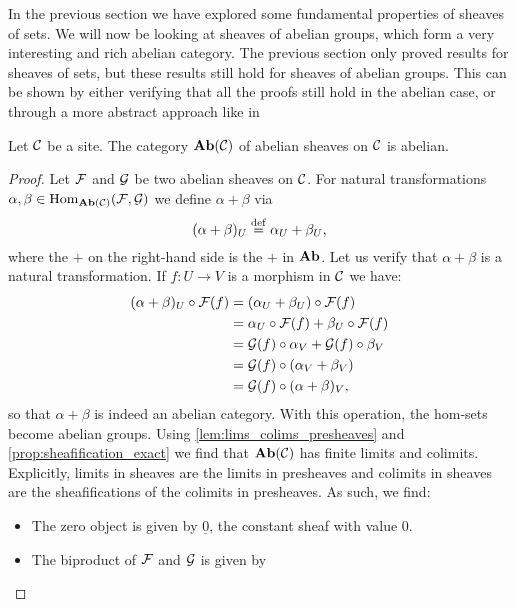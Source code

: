 \documentclass{article}
\begin{document}
In the previous section we have explored some
fundamental properties of sheaves of sets.
We will now be looking at sheaves of abelian groups,
which form a very interesting and rich abelian category.
The previous section only proved results for sheaves of
sets, but these results still hold for sheaves of abelian
groups. This can be shown by either verifying that all
the proofs still hold in the abelian case, or through
a more abstract approach like in
\cite[\href{https://stacks.math.columbia.edu/tag/00YR}{Section 00YR}]{stacks-project}
\begin{prop}
    Let $\mathcal{C}$ be a site. The category
    $\operatorname{\mathbf{Ab}}(\mathcal{C})$ of abelian sheaves on $\mathcal{C}$ is abelian.
\end{prop}
\begin{proof}
    Let $\mathcal{F}$ and $\mathcal{G}$ be two abelian sheaves on $\mathcal{C}$.
    For natural transformations $\alpha, \beta \in \operatorname{Hom}_{\operatorname{\mathbf{Ab}}(\mathcal{C})}(\mathcal{F}, \mathcal{G})$
    we define $\alpha + \beta$ via
    \begin{equation*}
        (\alpha + \beta)_U \overset{\mathrm{def}}{=} \alpha_U + \beta_U,
    \end{equation*}
    where the $+$ on the right-hand side is the $+$ in $\operatorname{\mathbf{Ab}}$.
    Let us verify that $\alpha + \beta$ is a natural transformation.
    If $f\colon U \to V$ is a morphism in $\mathcal{C}$ we have:
    \begin{align*}
        (\alpha + \beta)_U \circ \mathcal{F}(f)
         & = (\alpha_U + \beta_U) \circ \mathcal{F}(f)             \\
         & = \alpha_U \circ \mathcal{F}(f) + \beta_U \circ \mathcal{F}(f) \\
         & = \mathcal{G}(f) \circ \alpha_V + \mathcal{G}(f) \circ \beta_V \\
         & = \mathcal{G}(f) \circ (\alpha_V + \beta_V)             \\
         & = \mathcal{G}(f) \circ (\alpha + \beta)_V,
    \end{align*}
    so that $\alpha + \beta$ is indeed an abelian category.
    With this operation, the hom-sets become abelian groups.
    Using \cref{lem:lims_colims_presheaves} and \cref{prop:sheafification_exact}
    we find that $\operatorname{\mathbf{Ab}}(\mathcal{C})$ has finite limits and colimits.
    Explicitly, limits in sheaves are the limits in presheaves
    and colimits in sheaves are the sheafifications of the colimits in presheaves.
    As such, we find:
    \begin{itemize}
        \item The zero object is given by $\underline{0}$,
              the constant sheaf with value $0$.
        \item The biproduct of $\mathcal{F}$ and $\mathcal{G}$ is given by

\end{itemize}
\end{proof}
\end{document}
